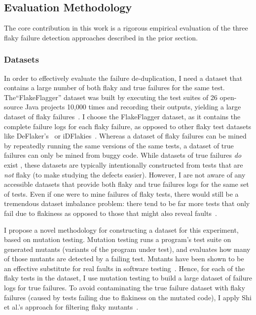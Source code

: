 \subsection{Evaluation Methodology}
\label{sec:matchingEvaluation}
The core contribution in this work is a rigorous empirical evaluation of the three flaky failure detection approaches described in the prior section.  

\subsubsection{Datasets}


In order to effectively evaluate the failure de-duplication, I need a dataset that contains a large number of both flaky and true failures for the same test.
The``FlakeFlagger'' dataset was built by executing the test suites of 26 open-source Java projects 10,000 times and recording their outputs, yielding a large dataset of flaky failures~\cite{alshammari2021flakeflagger}.
I choose the FlakeFlagger dataset, as it contains the complete failure logs for each flaky failure, as opposed to other flaky test datasets like DeFlaker's~\cite{bell2018deflaker} or iDFlakies~\cite{lam2019idflakies}.
Whereas a dataset of flaky failures can be mined by repeatedly running the same versions of the same tests, a dataset of true failures can only be mined from buggy code.
While datasets of true failures \emph{do} exist \cite{just2014defects4j,saha2018bugs,tomassi2019bugswarm,bears}, these datasets are typically intentionally constructed from tests that are \emph{not} flaky (to make studying the defects easier).
However, I are not aware of any accessible datasets that provide both flaky and true failures logs for the same set of tests.
Even if one were to mine failures of flaky tests, there would still be a tremendous dataset imbalance problem: there tend to be far more tests that only fail due to flakiness as opposed to those that might also reveal faults~\cite{haben2023importance}.

I propose a novel methodology for constructing a dataset for this experiment, based on mutation testing.
Mutation testing runs a program's test suite on generated mutants (variants of the program under test), and evaluates how many of those mutants are detected by a failing test.
Mutants have been shown to be an effective substitute for real faults in software testing~\cite{just2014mutants}.
Hence, for each of the flaky tests in the dataset, I use mutation testing to build a large dataset of failure logs for true failures.
To avoid contaminating the true failure dataset with flaky failures (caused by tests failing due to flakiness on the mutated code), I apply Shi et al.'s approach for filtering flaky mutants~\cite{shi2019mitigating}.

